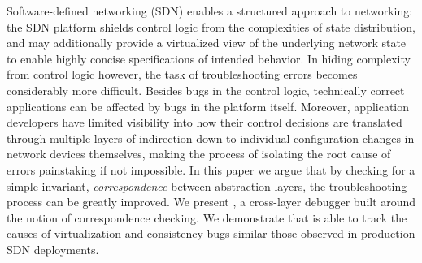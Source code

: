 Software-defined networking (SDN) enables a structured approach to
networking: the SDN platform shields control logic from the complexities of
state distribution, and may additionally provide a
virtualized view of the underlying network state to enable highly concise
specifications of intended behavior. In hiding complexity from control logic
however, the task of troubleshooting errors becomes
considerably more difficult. Besides bugs in the control logic, technically
correct applications can be affected by bugs in the platform itself. Moreover, application
developers have limited visibility into how their control decisions are translated through
multiple layers of indirection down to individual configuration changes
in network devices themselves, making the process of isolating the root cause
of errors painstaking if not impossible. In this paper we argue that by
checking for a simple invariant, {\em correspondence} between abstraction
layers, the troubleshooting process can be greatly improved. We present \projectname{},
a cross-layer debugger built around the notion of correspondence checking. We
demonstrate that \projectname{} is able to track the causes of virtualization
and consistency bugs similar those observed in production SDN deployments.
